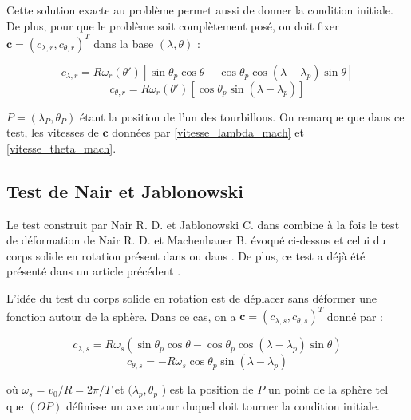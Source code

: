 Cette solution exacte au problème permet aussi de donner la condition initiale. De plus, pour que le problème soit complètement posé, on doit fixer $\mathbf{c} = ( c_{\lambda, r} , c_{\theta, r})^T$ dans la base $(\lambda, \theta)$ : 


\begin{equation}
c_{\lambda, r} = R \omega_r ( \theta' ) \left[ \sin \theta_p \cos \theta - \cos \theta_p \cos ( \lambda - \lambda_p ) \sin \theta \right]
\label{vitesse_lambda_mach}
\end{equation}
\begin{equation}
c_{\theta, r} = R \omega_r ( \theta' ) \left[ \cos \theta_p \sin ( \lambda - \lambda_p ) \right]
\label{vitesse_theta_mach}
\end{equation}

$P = ( \lambda_P, \theta_P)$ étant la position de l'un des tourbillons. On remarque que dans ce test, les vitesses de $\mathbf{c}$ données par \eqref{vitesse_lambda_mach} et \eqref{vitesse_theta_mach}.

\subsection{Test de Nair et Jablonowski}

Le test construit par Nair R. D. et Jablonowski C. dans \cite{Nair2008} combine à la fois le test de déformation de Nair R. D. et Machenhauer B. \cite{Nair2001} évoqué ci-dessus et celui du corps solide en rotation présent dans \cite{Nair1999} ou dans \cite{Williamson1994}. De plus, ce test a déjà été présenté dans un article précédent \cite{Croisille2013}. 

L'idée du test du corps solide en rotation est de déplacer sans déformer une fonction autour de la sphère. Dans ce cas, on a $\mathbf{c} = \left( c_{\lambda, s}, c_{\theta, s} \right)^T$ donné par :

\begin{equation}
c_{\lambda, s} = R \omega_s \left( \sin \theta_p \cos \theta - \cos \theta_p \cos ( \lambda - \lambda_p ) \sin \theta \right)
\label{vitesse_lambda_bump}
\end{equation}
\begin{equation}
c_{\theta, s} = - R \omega_s \cos \theta_p \sin ( \lambda - \lambda_p )
\label{vitesse_theta_bump}
\end{equation}

où $\omega_s = v_0 / R = 2 \pi / T $ et $( \lambda_p, \theta_p$ )  est la position de $P$ un point de la sphère tel que $(OP)$ définisse un axe autour duquel doit tourner la condition initiale.

